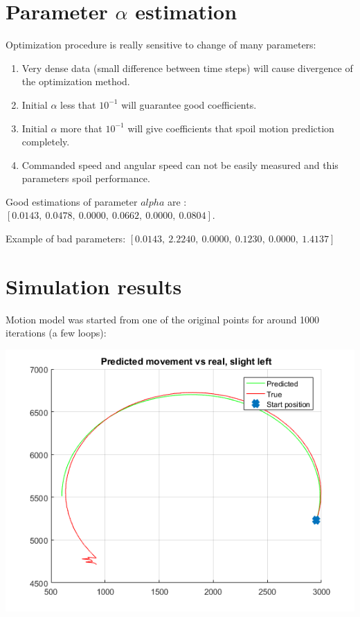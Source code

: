 \documentclass[a4paper, 12pt]{article}
\begin{document}
\section{Parameter $\alpha$ estimation}

Optimization procedure is really sensitive to change of many parameters:
\begin{enumerate}
\item Very dense data (small difference between time steps) will cause divergence of the optimization method.
\item Initial $\alpha$ less that $10^{-1}$ will guarantee good coefficients.
\item  Initial $\alpha$ more that $10^{-1}$ will give coefficients that spoil motion prediction completely.
\item Commanded speed and angular speed can not be easily measured and this parameters spoil performance.
\end{enumerate}

 \medskip
 Good estimations of parameter $alpha$ are :$[ 0.0143,~    0.0478,~    0.0000 ,~   0.0662,~    0.0000 ,~   0.0804].$
 \medskip

 Example of bad parameters:  $[0.0143,~    2.2240,~    0.0000 ,~   0.1230 ,~   0.0000 ,~   1.4137]$


\section{Simulation results}

Motion model was started from one of the original points for around 1000 iterations (a few loops):

\includegraphics[scale = 1]{gl.png}
\end{document}
